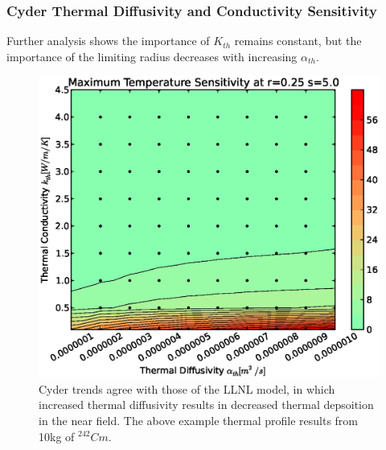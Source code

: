 \begin{frame}[ctb!]
\frametitle{Cyder Thermal Diffusivity and Conductivity Sensitivity}
Further \Cyder analysis shows the importance of $K_{th}$ remains constant, but 
the importance of the limiting radius decreases with increasing $\alpha_{th}$.
\begin{figure}[htbp!]
\begin{center}
\includegraphics[height=0.7\textheight]{./thermal_demonstration/diffusivity/ak.eps}
\caption[$\alpha_{th}$ vs. $K_{th}$ Sensitivity in Cyder]{Cyder trends agree
with those of the LLNL model, in which increased thermal diffusivity results in 
decreased thermal depsoition in the near field. The above example thermal 
profile results from 10kg of $^{242}Cm$.} 
\label{fig:ar}
\end{center}
\end{figure}
\end{frame}

